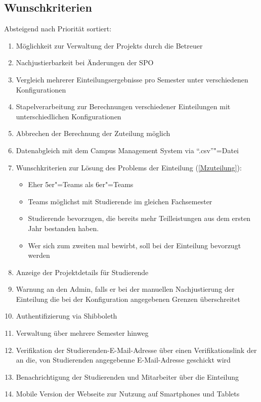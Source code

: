 \documentclass[parskip=full]{scrartcl}
\newcommand{\swtLabel}[1]{\textbf{/#1\arabic*0/}}
\begin{document}
\subsection{Wunschkriterien}
Absteigend nach Priorität sortiert:
\begin{enumerate}[label=\swtLabel{W}]
  \item Möglichkeit zur Verwaltung der \glspl{Projekt} durch die Betreuer
      \item Nachjustierbarkeit bei Änderungen der SPO 
  
    \item Vergleich mehrerer Einteilungsergebnisse pro Semester unter verschiedenen Konfigurationen
  \item Stapelverarbeitung zur Berechnungen verschiedener Einteilungen mit
    unterschiedlichen Konfigurationen
  \item Abbrechen der Berechnung der Zuteilung möglich 
        \item Datenabgleich mit dem Campus Management System via \enquote{.csv}"=Datei %

    \item Wunschkriterien zur Lösung des Problems der Einteilung (\ref{Mzuteilung}):
    \begin{itemize}
        \item Eher 5er"=Teams als 6er"=Teams
        \item Teams möglichst mit Studierende im gleichen Fachsemester 
        \item Studierende bevorzugen, die bereits mehr Teilleistungen aus dem
        ersten Jahr bestanden haben.
        \item Wer sich zum zweiten mal bewirbt, soll bei der Einteilung bevorzugt werden
    \end{itemize}    
\item Anzeige der Projektdetails für Studierende
\item Warnung an den \gls{Admin}, falls er bei der manuellen Nachjustierung 
    der Einteilung die bei der Konfiguration angegebenen Grenzen überschreitet
    \item Authentifizierung via Shibboleth
    \item Verwaltung über mehrere Semester hinweg
    \item Verifikation der Studierenden-E-Mail-Adresse über einen
    Verifikationslink der an die, von Studierenden angegebenne E-Mail-Adresse
    geschickt wird
    \item Benachrichtigung der Studierenden und Mitarbeiter über die Einteilung   
    
    
    \item Mobile Version der Webseite zur Nutzung auf Smartphones und Tablets
    
    
    
\end{enumerate}
\end{document}

